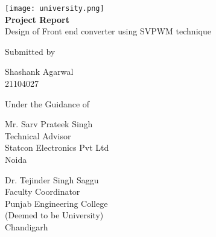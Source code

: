 \begin{titlepage}
    \begin{center}
        \vspace*{-3cm}
        \texttt{[image: university.png]}\\
        {\huge\textbf{Project Report}}\\

        \vspace*{1cm}
        {\Large Design of Front end converter using SVPWM technique}

        \vfill
        Submitted by

        \vfill
        Shashank Agarwal\\
        21104027

        \vfill
        Under the Guidance of
    \end{center}
    \vfill

    \noindent
    \begin{minipage}[t]{0.45\textwidth}
        Mr. Sarv Prateek Singh\\
        Technical Advisor\\
        Statcon Electronics Pvt Ltd\\
        Noida
    \end{minipage}
    \hfill
    \begin{minipage}[t]{0.45\textwidth}
        \raggedleft
        Dr. Tejinder Singh Saggu\\
        Faculty Coordinator\\
        Punjab Engineering College\\
        (Deemed to be University)\\
        Chandigarh
    \end{minipage}
\end{titlepage}